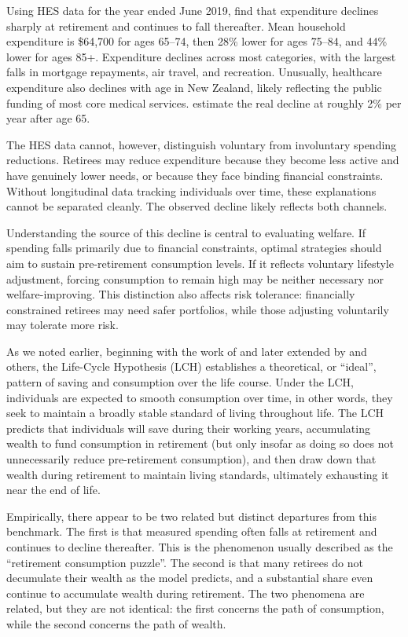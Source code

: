 \documentclass[11pt]{article}
\begin{document}
Using HES data for the year ended June 2019, \textcite{le2023expenditure} find that expenditure declines sharply at retirement and continues to fall thereafter. Mean household expenditure is \$64,700 for ages 65--74, then 28\% lower for ages 75--84, and 44\% lower for ages 85+. Expenditure declines across most categories, with the largest falls in mortgage repayments, air travel, and recreation. Unusually, healthcare expenditure also declines with age in New Zealand, likely reflecting the public funding of most core medical services. \textcite{riig2024spending} estimate the real decline at roughly 2\% per year after age 65.

The HES data cannot, however, distinguish voluntary from involuntary spending reductions. Retirees may reduce expenditure because they become less active and have genuinely lower needs, or because they face binding financial constraints. Without longitudinal data tracking individuals over time, these explanations cannot be separated cleanly. The observed decline likely reflects both channels.

Understanding the source of this decline is central to evaluating welfare. If spending falls primarily due to financial constraints, optimal strategies should aim to sustain pre-retirement consumption levels. If it reflects voluntary lifestyle adjustment, forcing consumption to remain high may be neither necessary nor welfare-improving. This distinction also affects risk tolerance: financially constrained retirees may need safer portfolios, while those adjusting voluntarily may tolerate more risk.

As we noted earlier, beginning with the work of \textcite{modigliani1954utility} and later extended by \textcite{ando1963lifecycleHypothesis} and others, the Life-Cycle Hypothesis (LCH) establishes a theoretical, or ``ideal'', pattern of saving and consumption over the life course. Under the LCH, individuals are expected to smooth consumption over time, in other words, they seek to maintain a broadly stable standard of living throughout life. The LCH predicts that individuals will save during their working years, accumulating wealth to fund consumption in retirement (but only insofar as doing so does not unnecessarily reduce pre-retirement consumption), and then draw down that wealth during retirement to maintain living standards, ultimately exhausting it near the end of life.

Empirically, there appear to be two related but distinct departures from this benchmark. The first is that measured spending often falls at retirement and continues to decline thereafter. This is the phenomenon usually described as the ``retirement consumption puzzle''. The second is that many retirees do not decumulate their wealth as the model predicts, and a substantial share even continue to accumulate wealth during retirement. The two phenomena are related, but they are not identical: the first concerns the path of consumption, while the second concerns the path of wealth.
\end{document}
